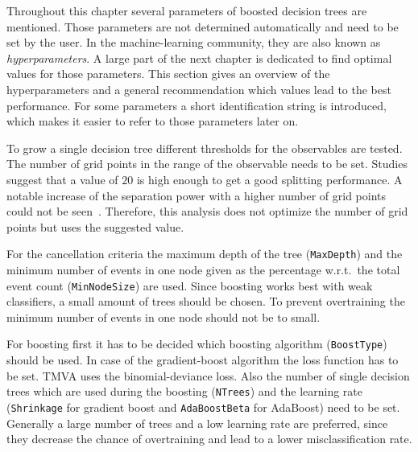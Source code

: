Throughout this chapter several parameters of boosted decision trees are mentioned.
Those parameters are not determined automatically and need to be set by the user.
In the machine-learning community, they are also known as \emph{hyperparameters}.
A large part of the next chapter is dedicated to find optimal values for those parameters.
This section gives an overview of the hyperparameters and a general recommendation which values lead to the best
performance.
For some parameters a short identification string is introduced, which makes it easier to refer to
those parameters later on.

To grow a single decision tree different thresholds for the observables are tested.
The number of grid points in the range of the observable needs to be set.
Studies suggest that a value of $20$ is high enough to get a good splitting performance.
A notable increase of the separation power with a higher number of grid points could not be seen~\cite{TMVA}.
Therefore, this analysis does not optimize the number of grid points but uses the suggested value.

For the cancellation criteria the maximum depth of the tree (\texttt{MaxDepth}) and the minimum number of events in one node
given as the percentage w.r.t.\ the total event count (\texttt{MinNodeSize}) are used.
Since boosting works best with weak classifiers, a small amount of trees should be chosen.
To prevent overtraining the minimum number of events in one node should not be to small.

For boosting first it has to be decided which boosting algorithm (\texttt{BoostType}) should be used.
In case of the gradient-boost algorithm the loss function has to be set.
TMVA uses the binomial-deviance loss.
Also the number of single decision trees which are used during the boosting (\texttt{NTrees}) and the
learning rate (\texttt{Shrinkage} for gradient boost and \texttt{AdaBoostBeta} for AdaBoost) need to be set.
Generally a large number of trees and a low learning rate are preferred, since they decrease the chance of overtraining
and lead to a lower misclassification rate.
